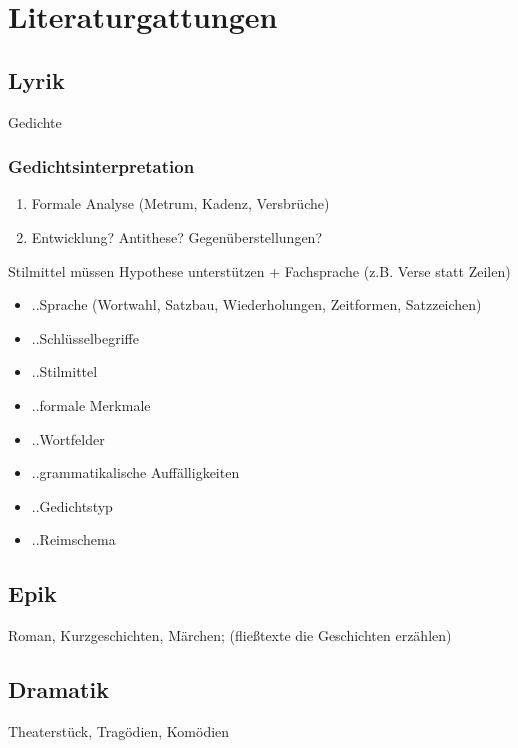 
\section{Literaturgattungen}

\subsection{Lyrik}

 Gedichte

\subsubsection{Gedichtsinterpretation}

\begin{enumerate}
    \item Formale Analyse (Metrum, Kadenz, Versbrüche)
    \item Entwicklung? Antithese? Gegenüberstellungen?
\end{enumerate}

 Stilmittel müssen Hypothese unterstützen + Fachsprache (z.B. Verse statt Zeilen)

\begin{itemize}
    \item ..Sprache (Wortwahl, Satzbau, Wiederholungen, Zeitformen, Satzzeichen)
    \item ..Schlüsselbegriffe 
    \item ..Stilmittel
    \item ..formale Merkmale
    \item ..Wortfelder
    \item ..grammatikalische Auffälligkeiten
    \item ..Gedichtstyp
    \item ..Reimschema
\end{itemize}

\subsection{Epik}

 Roman, Kurzgeschichten, Märchen; (fließtexte die Geschichten erzählen)

\subsection{Dramatik}

 Theaterstück, Tragödien, Komödien


